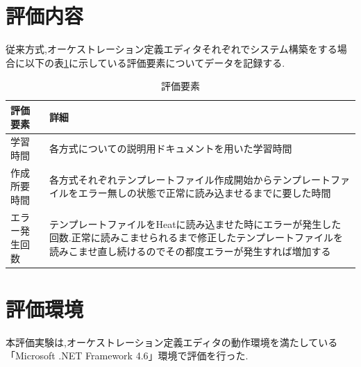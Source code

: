 \documentclass[mingoth]{kut-paper}		%
\begin{document}
	\section{評価内容}
	従来方式,オーケストレーション定義エディタそれぞれでシステム構築をする場合に以下の表\ref{table:5}に示している評価要素についてデータを記録する.
	\begin{table}[H]
		\begin{center}
			\caption{評価要素}
			\label{table:5}
			\begin{tabular}{|p{5cm}|p{7cm}|}\hline
				評価要素 & 詳細\\ \hline \hline
				学習時間 & 各方式についての説明用ドキュメントを用いた学習時間\\ \hline
				作成所要時間 & 各方式それぞれテンプレートファイル作成開始からテンプレートファイルをエラー無しの状態で正常に読み込ませるまでに要した時間\\ \hline
				エラー発生回数 & テンプレートファイルをHeatに読み込ませた時にエラーが発生した回数.正常に読みこませられるまで修正したテンプレートファイルを読みこませ直し続けるのでその都度エラーが発生すれば増加する\\ \hline
			\end{tabular}
		\end{center}
	\end{table}
	\section{評価環境}
	本評価実験は,オーケストレーション定義エディタの動作環境を満たしている「Microsoft .NET Framework 4.6」環境で評価を行った.
	
\end{document}
